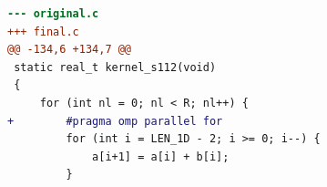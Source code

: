 \begin{lstlisting}[language=diff,basicstyle=\ttfamily\scriptsize,breaklines=true,caption={tsvc/s112 — BROKEN (e1_bare_a)}]
--- original.c
+++ final.c
@@ -134,6 +134,7 @@
 static real_t kernel_s112(void)
 {
     for (int nl = 0; nl < R; nl++) {
+        #pragma omp parallel for
         for (int i = LEN_1D - 2; i >= 0; i--) {
             a[i+1] = a[i] + b[i];
         }
\end{lstlisting}

